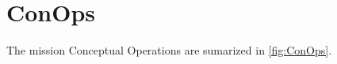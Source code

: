 \section{ConOps}
\label{sec:conops}
The mission Conceptual Operations are sumarized in \autoref{fig:ConOps}.

